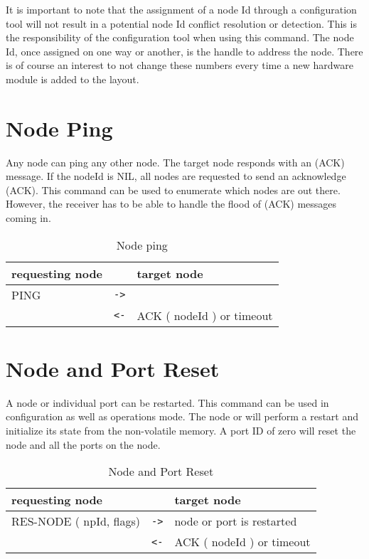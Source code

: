 It is important to note that the assignment of a node Id through a configuration tool will not result in a potential node Id conflict resolution or detection. This is the responsibility of the configuration tool when using this command. The node Id, once assigned on one way or another, is the handle to address the node. There is of course an interest to not change these numbers every time a new hardware module is added to the layout.

\section{Node Ping}

Any node can ping any other node. The target node responds with an (ACK) message. If the nodeId is NIL, all nodes are requested to send an acknowledge (ACK). This command can be used to enumerate which nodes are out there. However, the receiver has to be able to handle the flood of (ACK) messages coming in.

\begin{table}[ht!]
    \begin{center}
        \caption{Node ping}
        \begin{tabular}{|p{}| c |p{}|}
            \toprule
            \textbf{requesting node} & & \textbf{ target node} \\
            \midrule
            PING & \texttt{->} & \\
            \midrule
            & \texttt{<-} & ACK ( nodeId ) or timeout \\
            \bottomrule
        \end{tabular}
    \end{center}
\end{table}

\section{Node and Port Reset}

A node or individual port can be restarted. This command can be used in configuration as well as operations mode. The node or will perform a restart and initialize its state from the non-volatile memory. A port ID of zero will reset the node and all the ports on the node.

\begin{table}[ht!]
    \begin{center}
        \caption{Node and Port Reset}
        \begin{tabular}{|p{}| c |p{}|}
            \toprule
            \textbf{requesting node} & & \textbf{ target node} \\
            \midrule
            RES-NODE ( npId, flags) & \texttt{->} & node or port is restarted \\
            \midrule
            & \texttt{<-} & ACK ( nodeId ) or timeout \\
            \bottomrule
        \end{tabular}
    \end{center}
\end{table}

